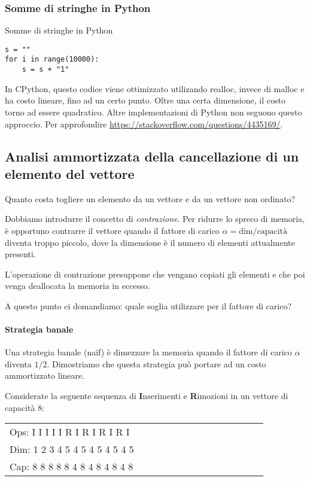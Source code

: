 \subsubsection{Somme di stringhe in Python}

\begin{listing}[H]
\caption{Somme di stringhe in Python}
\begin{verbatim}
s = ""
for i in range(10000):
    s = s + "1"
\end{verbatim}
\end{listing}

In CPython, questo codice viene ottimizzato utilizando \textsf{realloc}, invece di \textsf{malloc} e ha costo lineare, fino ad un certo punto.
Oltre una certa dimensione, il costo torno ad essere quadratico.
Altre implementazioni di Python non seguono questo approccio.
Per approfondire \href{https://stackoverflow.com/questions/4435169/}{https://stackoverflow.com/questions/4435169/}.

\subsection{Analisi ammortizzata della cancellazione di un elemento del vettore}

Quanto costa togliere un elemento da un vettore e da un vettore non ordinato?

Dobbiamo introdurre il concetto di \emph{contrazione}.
Per ridurre lo spreco di memoria, è opportuno contrarre il vettore quando il fattore di carico \(\alpha = \text{dim}/\text{capacità}\) diventa troppo piccolo, dove la dimensione è il numero di elementi attualmente presenti.

L'operazione di contrazione presuppone che vengano copiati gli elementi e che poi venga deallocata la memoria in eccesso.

A questo punto ci domandiamo: quale soglia utilizzare per il fattore di carico?

\paragraph{Strategia banale}
Una strategia banale (na\"if) è dimezzare la memoria quando il fattore di carico \(\alpha\) diventa \(1/2\).
Dimostriamo che questa strategia può portare ad un costo ammortizzato lineare.

Considerate la seguente sequenza di \textbf{I}nserimenti e \textbf{R}imozioni in un vettore di capacità 8:

\begin{center}
\begin{tabular}{@{} *{14}{>{\ttfamily}l} @{}}
    Ops: I I I I I R I R I R I R I\\
    Dim: 1 2 3 4 5 4 5 4 5 4 5 4 5\\
    Cap: 8 8 8 8 8 4 8 4 8 4 8 4 8\\
\end{tabular}
\end{center}

